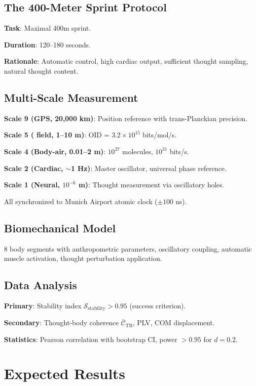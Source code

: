 \documentclass[12pt,twocolumn]{article}
\theoremstyle{remark}
\begin{document}
\subsection{The 400-Meter Sprint Protocol}

\textbf{Task}: Maximal 400m sprint.

\textbf{Duration}: 120--180 seconds.

\textbf{Rationale}: Automatic control, high cardiac output, sufficient thought sampling, natural thought content.

\subsection{Multi-Scale Measurement}

\textbf{Scale 9 (GPS, 20,000 km)}: Position reference with trans-Planckian precision.

\textbf{Scale 5 ( field, 1--10 m)}: OID = $3.2 \times 10^{15}$ bits/mol/s.

\textbf{Scale 4 (Body-air, 0.01--2 m)}: $10^{27}$ molecules, $10^{31}$ bits/s.

\textbf{Scale 2 (Cardiac, $\sim$1 Hz)}: Master oscillator, universal phase reference.

\textbf{Scale 1 (Neural, $10^{-6}$ m)}: Thought measurement via oscillatory holes.

All synchronized to Munich Airport atomic clock ($\pm 100$ ns).

\subsection{Biomechanical Model}

8 body segments with anthropometric parameters, oscillatory coupling, automatic muscle activation, thought perturbation application.

\subsection{Data Analysis}

\textbf{Primary}: Stability index $\mathcal{S}_{\text{stability}} > 0.95$ (success criterion).

\textbf{Secondary}: Thought-body coherence $\bar{\mathcal{C}}_{\text{TB}}$, PLV, COM displacement.

\textbf{Statistics}: Pearson correlation with bootstrap CI, power $> 0.95$ for $d = 0.2$.

\section{Expected Results}
\end{document}
